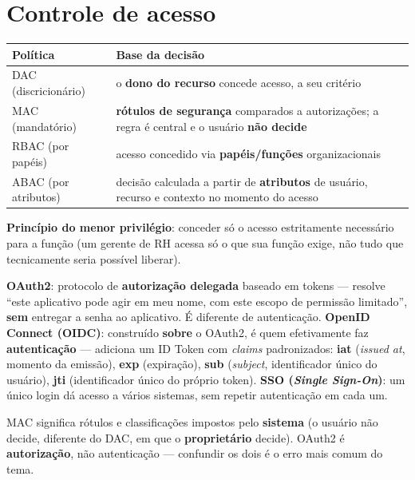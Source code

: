 \section{Controle de acesso}

\begin{conceito}
\begin{center}
\begin{tabular}{@{}p{3cm}p{8.2cm}@{}}
\toprule
\textbf{Política} & \textbf{Base da decisão} \\
\midrule
DAC (discricionário) & o \textbf{dono do recurso} concede acesso, a seu
critério \\
MAC (mandatório) & \textbf{rótulos de segurança} comparados a
autorizações; a regra é central e o usuário \textbf{não decide} \\
RBAC (por papéis) & acesso concedido via \textbf{papéis/funções}
organizacionais \\
ABAC (por atributos) & decisão calculada a partir de \textbf{atributos}
de usuário, recurso e contexto no momento do acesso \\
\bottomrule
\end{tabular}
\end{center}

\textbf{Princípio do menor privilégio}: conceder só o acesso estritamente
necessário para a função (um gerente de RH acessa só o que sua função
exige, não tudo que tecnicamente seria possível liberar).
\end{conceito}

\begin{conceito}
\textbf{OAuth2}: protocolo de \textbf{autorização delegada} baseado em
tokens --- resolve “este aplicativo pode agir em meu nome, com este
escopo de permissão limitado”, \textbf{sem} entregar a senha ao
aplicativo. É diferente de autenticação. \textbf{OpenID Connect (OIDC)}:
construído \textbf{sobre} o OAuth2, é quem efetivamente faz
\textbf{autenticação} --- adiciona um ID Token com \textit{claims}
padronizados: \textbf{iat} (\textit{issued at}, momento da emissão),
\textbf{exp} (expiração), \textbf{sub} (\textit{subject}, identificador
único do usuário), \textbf{jti} (identificador único do próprio token).
\textbf{SSO (\textit{Single Sign-On})}: um único login dá acesso a vários
sistemas, sem repetir autenticação em cada um.
\end{conceito}

\begin{cuidado}
MAC significa rótulos e classificações impostos pelo \textbf{sistema} (o
usuário não decide, diferente do DAC, em que o \textbf{proprietário}
decide). OAuth2 é \textbf{autorização}, não autenticação --- confundir os
dois é o erro mais comum do tema.
\end{cuidado}

